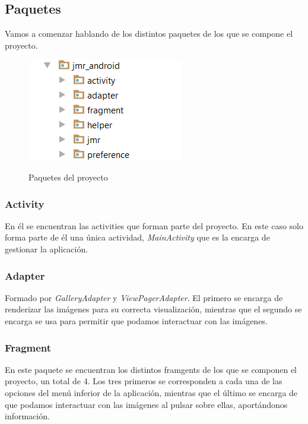 \subsection{Paquetes}

Vamos a comenzar hablando de los distintos paquetes de los que se compone el proyecto.

\begin{figure}[H] %
\centering
\includegraphics[scale=0.9]{imagenes/paquetes.png}  %
\label{paquetes}
\caption{Paquetes del proyecto}
\end{figure}

\subsubsection{Activity}

En él se encuentran las activities que forman parte del proyecto. En este caso solo forma parte de él una única actividad, \textit{MainActivity} que es la encarga de gestionar la aplicación.

\subsubsection{Adapter}

Formado por \textit{GalleryAdapter} y \textit{ViewPagerAdapter}. El primero se encarga de renderizar las imágenes para su correcta visualización, mientras que el segundo se encarga se usa para permitir que podamos interactuar con las imágenes.

\subsubsection{Fragment}

En este paquete se encuentran los distintos framgents de los que se componen el proyecto, un total de 4. Los tres primeros se corresponden a cada una de las opciones del menú inferior de la aplicación, mientras que el último se encarga de que podamos interactuar con las imágenes al pulsar sobre ellas, aportándonos información.

